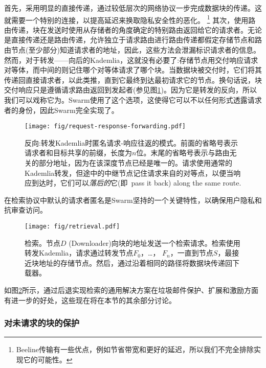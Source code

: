 首先，采用明显的直接传递，通过较低层次的网络协议一步完成数据块的传递。这就需要一个特别的连接，以提高延迟来换取隐私安全性的恶化。%
%
\footnote{Beeline传输有一些优点，例如节省带宽和更好的延迟，所以我们不完全排除实现它的可能性。 
}
其次，使用路由传递，块在发送时使用从存储者的角度确定的特别路由返回给它的请求者。无论是直接传递还是路由传递，允许独立于请求路由进行路由传递都假定存储节点和路由节点(至少部分)知道请求者的地址，因此，这些方法会泄漏标识请求者的信息。然而，对于转发——向后的Kademlia，这就没有必要了:存储节点用交付响应请求对等体，而中间的则记住哪个对等体请求了哪个块。当数据块被交付时，它们将其传递回直接请求者，以此类推，直到它最终到达最初请求它的节点。换句话说，块交付响应只是遵循请求路由返回到发起者(参见图\ref{fig:request-response})。因为它是转发的反向，所以我们可以戏称它为。Swarm使用了这个选项，这使得它可以不以任何形式透露请求者的身份，因此Swarm完全实现了。 

\begin{figure}[htbp]
   \centering
   \texttt{[image: fig/request-response-forwarding.pdf]}
   \caption[反向:转发Kademlia 时匿名请求-响应往返的模式\statusgreen]{反向:转发Kademlia时匿名请求-响应往返的模式。前面的省略号表示请求者和目标共享的前缀，长度为$n$位。末尾的省略号表示与路由无关的部分地址，因为在该深度节点已经是唯一的。请求使用通常的Kademlia转发，但途中的中继节点记住请求来自的对等点，以便当响应到达时，它们可以\emph{落后的}它(即\ pass it back) along the same route.}
   \label{fig:request-response}
\end{figure}

在检索协议中默认的请求者匿名是Swarm坚持的一个关键特性，以确保用户隐私和抗审查访问。

\begin{figure}[htbp]
   \centering
   \texttt{[image: fig/retrieval.pdf]}
   \caption[检索\statusgreen]{检索。节点$D$ (Downloader)向块的地址发送一个检索请求。检索使用转发Kademlia，请求通过转发节点$F_0$，…， $F_n$，一直到节点$S$，最接近块地址的存储节点。然后，通过沿着相同的路径将数据块传递回下载器。}
   \label{fig:retrieval}
\end{figure}

如图\ref{fig:retrieval}所示，通过后退实现检索的通用解决方案在垃圾邮件保护、扩展和激励方面有进一步的好处，这些现在将在本节的其余部分讨论。

\subsubsection{对未请求的块的保护}

